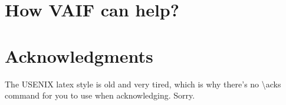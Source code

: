 


\section{How VAIF can help?}



\section*{Acknowledgments}

The USENIX latex style is old and very tired, which is why
there's no \textbackslash{}acks command for you to use when
acknowledging. Sorry.






